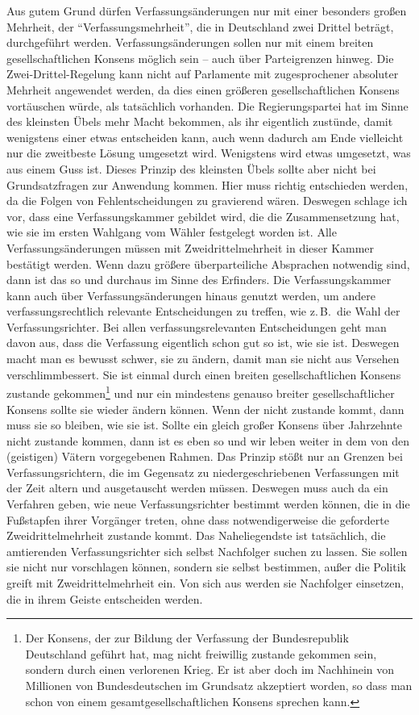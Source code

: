 Aus gutem Grund dürfen Verfassungsänderungen nur mit einer besonders großen Mehrheit, der
\enquote{Verfassungsmehrheit}, die in Deutschland zwei Drittel beträgt, durchgeführt werden.
Verfassungsänderungen sollen nur mit einem breiten gesellschaftlichen Konsens möglich sein --
auch über Parteigrenzen hinweg. Die Zwei-Drittel-Regelung kann nicht auf Parlamente mit
zugesprochener absoluter Mehrheit angewendet werden, da dies einen größeren gesellschaftlichen
Konsens vortäuschen würde, als tatsächlich vorhanden. Die Regierungspartei hat im Sinne des
kleinsten Übels mehr Macht bekommen, als ihr eigentlich zustünde, damit wenigstens einer etwas
entscheiden kann, auch wenn dadurch am Ende vielleicht nur die zweitbeste Lösung umgesetzt wird.
Wenigstens wird etwas umgesetzt, was aus einem Guss ist.
Dieses Prinzip des kleinsten Übels sollte aber nicht bei Grundsatzfragen zur Anwendung kommen.
Hier muss richtig entschieden werden, da die Folgen von Fehlentscheidungen zu gravierend wären.
Deswegen schlage ich vor, dass eine Verfassungskammer gebildet wird, die die Zusammensetzung hat,
wie sie im ersten Wahlgang vom Wähler festgelegt worden ist. Alle Verfassungsänderungen müssen
mit Zweidrittelmehrheit in dieser Kammer bestätigt werden. Wenn dazu größere überparteiliche
Absprachen notwendig sind, dann ist das so und durchaus im Sinne des Erfinders.
Die Verfassungskammer kann auch über Verfassungsänderungen hinaus genutzt werden, um andere
verfassungsrechtlich relevante Entscheidungen zu treffen, wie z.\,B.\ die Wahl der
Verfassungsrichter.
Bei allen verfassungsrelevanten Entscheidungen geht man davon aus, dass die Verfassung
eigentlich schon gut so ist, wie sie ist. Deswegen macht man es bewusst schwer, sie zu ändern,
damit man sie nicht aus Versehen verschlimmbessert. Sie ist einmal durch einen breiten
gesellschaftlichen Konsens zustande gekommen\footnote{Der Konsens, der zur Bildung der Verfassung
der Bundesrepublik Deutschland geführt hat, mag nicht freiwillig zustande gekommen sein, sondern
durch einen verlorenen Krieg. Er ist aber doch im Nachhinein von Millionen von Bundesdeutschen im
Grundsatz akzeptiert worden, so dass man schon von einem gesamtgesellschaftlichen Konsens
sprechen kann.} und nur ein mindestens genauso breiter gesellschaftlicher Konsens sollte sie
wieder ändern können. Wenn der nicht zustande kommt, dann muss sie so bleiben, wie sie ist.
Sollte ein gleich großer Konsens über Jahrzehnte nicht zustande kommen, dann ist es eben so und
wir leben weiter in dem von den (geistigen) Vätern vorgegebenen Rahmen. Das Prinzip stößt nur an
Grenzen bei Verfassungsrichtern, die im Gegensatz zu niedergeschriebenen Verfassungen mit der
Zeit altern und ausgetauscht werden müssen. Deswegen muss auch da ein Verfahren geben, wie neue
Verfassungsrichter bestimmt werden können, die in die Fußstapfen ihrer Vorgänger treten, ohne
dass notwendigerweise die geforderte Zweidrittelmehrheit zustande kommt. Das Naheliegendste ist
tatsächlich, die amtierenden Verfassungsrichter sich selbst Nachfolger suchen zu lassen. Sie
sollen sie nicht nur vorschlagen können, sondern sie selbst bestimmen, außer die Politik greift
mit Zweidrittelmehrheit ein. Von sich aus werden sie Nachfolger einsetzen, die in ihrem Geiste
entscheiden werden.
